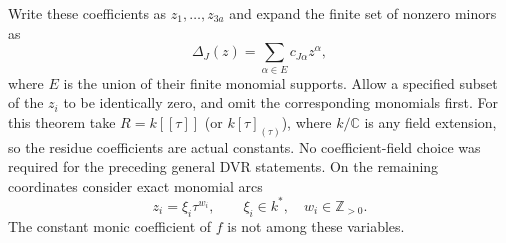 \documentclass[11pt,reqno]{amsart}
\numberwithin{equation}{section}
\theoremstyle{definition}\newtheorem{definition}[theorem]{Definition}
\theoremstyle{remark}\newtheorem{remark}[theorem]{Remark}
\newcommand{\C}{\mathbb C}\newcommand{\Q}{\mathbb Q}
\begin{document}
Write these coefficients as $z_1,\ldots,z_{3a}$ and expand the
finite set of nonzero minors as
\[
 \Delta_J(z)=\sum_{\alpha\in E}c_{J\alpha}z^\alpha,
\]
where $E$ is the union of their finite monomial supports. Allow a
specified subset of the $z_i$ to be identically zero, and omit the
corresponding monomials first. For this theorem take $R=k[[\tau]]$ (or $k[\tau]_{(\tau)}$),
where $k/\C$ is any field extension, so the residue coefficients
are actual constants. No coefficient-field choice was required
for the preceding general DVR statements. On the remaining
coordinates consider exact monomial arcs
\begin{equation}\label{eq:monomial-arcs-v167}
 z_i=\xi_i\tau^{w_i},\qquad \xi_i\in k^*,\quad
                              w_i\in\mathbb Z_{>0}.
\end{equation}
The constant monic coefficient of $f$ is not among these variables.
\end{document}
